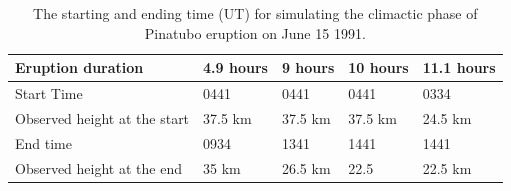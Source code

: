 \begin{table}[htp]
\centering
      \caption{The starting and ending time (UT) for simulating the climactic phase of Pinatubo eruption on June 15 1991.}		
	  \begin{tabular}{p{45mm}p{23mm}p{23mm}p{23mm}p{23mm}}
	    \hline
        Eruption duration & 4.9 hours & 9 hours & 10 hours & 11.1 hours \\
	    \hline
	    Start Time & 0441 & 0441 & 0441 & 0334 \\
	    	Observed height at the start & 37.5 km & 37.5 km  & 37.5 km  & 24.5 km \\
	    
	    End time   & 0934 & 1341 & 1441 & 1441  \\
	    		Observed height at the end & 35 km & 26.5 km & 22.5 & 22.5 km \\
	    \hline
	  \end{tabular}
	  \label{tab:Pinatubo-eruption-duration}
\end{table}

